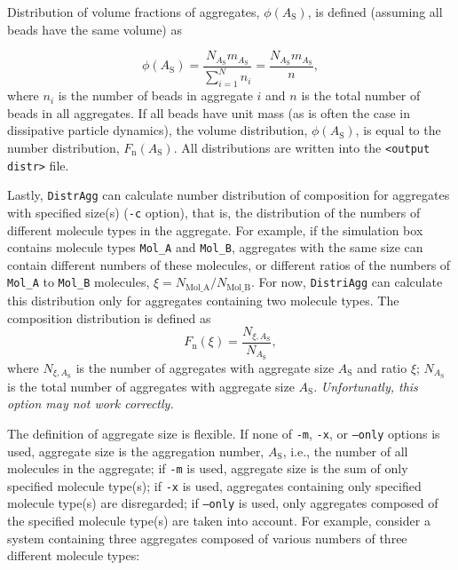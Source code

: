 Distribution of volume fractions of aggregates, $\phi(A_{\mathrm{S}})$, is
defined (assuming all beads have the same volume) as

\begin{equation} \label{eq:Fvol}
  \phi(A_{\mathrm{S}}) = \frac{N_{A_{\mathrm{S}} } m_{A_{\mathrm{S}} }}{\sum_{i=1}^N n_i} =
  \frac{N_{A_{\mathrm{S}} } m_{A_{\mathrm{S}} }}{n},
\end{equation}
where $n_i$ is the number of beads in aggregate $i$ and $n$ is the total
number of beads in all aggregates. If all beads have unit mass (as is often
the case in dissipative particle dynamics), the volume distribution,
$\phi(A_{\mathrm{S}})$, is equal to the number distribution,
$F_{\mathrm{n}}(A_{\mathrm{S}})$.
All distributions are written into the \texttt{<output distr>} file.

Lastly, \texttt{DistrAgg} can calculate number distribution of composition
for aggregates with specified size(s) (\texttt{-c} option), that is, the
distribution of the numbers of different molecule types in the aggregate.
For example, if the simulation box contains molecule types \texttt{Mol\_A}
and \texttt{Mol\_B}, aggregates with the same size can contain different
numbers of these molecules, or different ratios of the numbers of
\texttt{Mol\_A} to \texttt{Mol\_B} molecules,
$\xi=N_{\mathrm{Mol\_A}}/N_{\mathrm{Mol\_B}}$. For now, \texttt{DistriAgg}
can calculate this distribution only for aggregates containing two molecule
types. The composition distribution is defined as
\begin{equation} \label{eq:CompDistr}
  F_{\mathrm{n}}(\xi) = \frac{N_{\xi,A_{\mathrm{S}} }}{N_{A_{\mathrm{S}}} },
\end{equation}
where $N_{\xi,A_{\mathrm{S}} }$ is the number of aggregates with aggregate
size $A_{\mathrm{S}}$ and ratio $\xi$; $N_{A_{\mathrm{S}}}$ is the total
number of aggregates with aggregate size $A_{\mathrm{S}}$.
\textit{Unfortunatly, this option may not work correctly.}

The definition of aggregate size is flexible. If none of \texttt{-m},
\texttt{-x}, or \texttt{--only} options is used, aggregate size is the
 aggregation number, $A_{\mathrm{S}}$, i.e., the number of all
molecules in the aggregate; if \texttt{-m} is used, aggregate size is the
sum of only specified molecule type(s); if \texttt{-x} is used, aggregates
containing only specified molecule type(s) are disregarded; if
\texttt{--only} is used, only aggregates composed of the specified molecule
type(s) are taken into account. For example, consider a system containing
three aggregates composed of various numbers of three different molecule
types:

